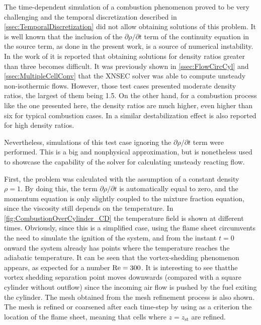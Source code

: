 The time-dependent simulation of a combustion phenomenon proved to be very challenging and the temporal discretization described in \cref{ssec:TemporalDiscretization} did not allow obtaining solutions of this problem. It is well known that the inclusion of the $\partial\rho /\partial t$ term of the continuity equation in the source term, as done in the present work, is a source of numerical instability. In the work of \textcite{nicoudConservativeHighOrderFiniteDifference2000} it is reported that obtaining solutions for density ratios greater than three  becomes difficult. It was previously shown in \cref{ssec:FlowCircCyl} and \cref{ssec:MultipleCellConv} that the XNSEC solver was able to compute unsteady non-isothermic flows. However, those test cases presented moderate density ratios, the largest of them being 1.5. On the other hand, for a combustion process like the one presented here, the density ratios are much higher, even higher than six for typical combustion cases. In \textcite{rauwoensConservativeDiscreteCompatibilityconstraint2009} a similar destabilization effect is also reported for high density ratios. 

Nevertheless, simulations of this test case ignoring the  $\partial\rho /\partial t$ term were performed. This is a big and nonphysical approximation, but is nonetheless used to showcase the capability of the solver for calculating unsteady reacting flow.
 
First, the problem was calculated with the assumption of a constant density $\rho = 1$. By doing this, the term $\partial\rho /\partial t$ is automatically equal to zero, and the momentum equation is only slightly coupled to the mixture fraction equation, since the viscosity still depends on the temperature. 
In \cref{fig:CombustionOverCylinder_CD} the temperature field is shown at different times. Obviously, since this is a simplified case, using the flame sheet circumvents the need to simulate the ignition of the system, and from the instant $t=0$ onward the system already has points where the temperature reaches the adiabatic temperature. It can be seen that the vortex-shedding phenomenon appears, as expected for a number $ \text{Re} = 300$. It is interesting to see thatthe vortex shedding separation point moves downwards (compared with a square cylinder without outflow) since the incoming air flow is pushed by the fuel exiting the cylinder. The mesh obtained from the mesh refinement process is also shown. The mesh is refined or coarsened after each time-step by using as a criterion the location of the flame sheet, meaning that cells where $z = z_{\text{st}}$ are refined.

